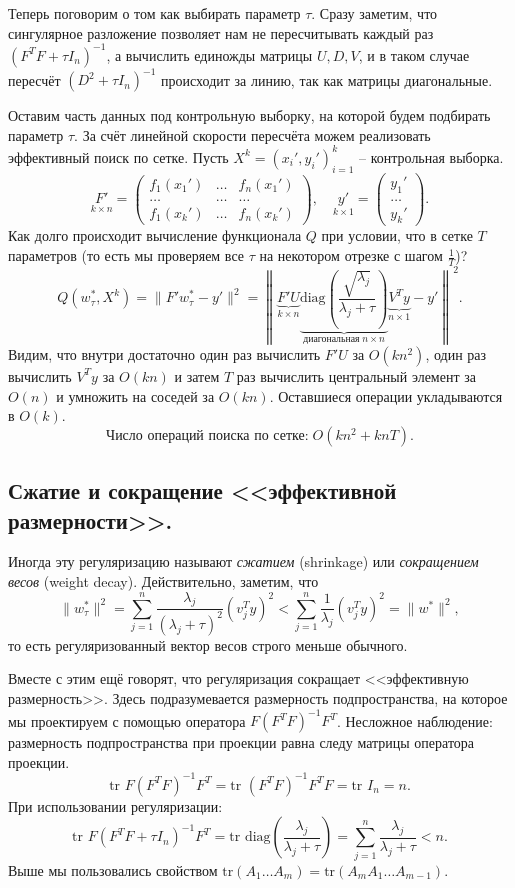 Теперь поговорим о том как выбирать параметр $\tau$. Сразу заметим, что сингулярное разложение позволяет нам не пересчитывать каждый раз $(F^TF + \tau I_n)^{-1}$, а вычислить единожды матрицы $U, D, V$, и в таком случае пересчёт $(D^2 + \tau I_n)^{-1}$ происходит за линию, так как матрицы диагональные.

Оставим часть данных под контрольную выборку, на которой будем подбирать параметр $\tau$. За счёт линейной скорости пересчёта можем реализовать эффективный поиск по сетке. Пусть $X^k = (x_i', y_i')_{i=1}^k$ -- контрольная выборка.
$$\underset{k \times n}{F'} = \begin{pmatrix}
    f_1(x_1') & \dots & f_n(x_1')  \\
    \dots     & \dots & \dots      \\
    f_1(x_k') & \dots & f_n(x_k')
  \end{pmatrix}, \quad \underset{k \times 1}{y'} = \begin{pmatrix}
    y_1'  \\
    \dots \\
    y_k'
  \end{pmatrix}.$$
Как долго происходит вычисление функционала $Q$ при условии, что в сетке $T$ параметров (то есть мы проверяем все $\tau$ на некотором отрезке с шагом $\frac{1}{T}$)?
$$Q(w_\tau^*, X^k) = \|F'w_\tau^* - y'\|^2 = \left\|\underset{k \times n}{\underbrace{F'U}} \underset{\text{диагональная} \; n \times n}{\underbrace{\text{diag}\left(\frac{\sqrt{\lambda_j}}{\lambda_j + \tau}\right)}}\underset{n \times 1}{\underbrace{V^Ty}} - y'\right\|^2.$$
Видим, что внутри достаточно один раз вычислить $F'U$ за $O(kn^2)$, один раз вычислить $V^Ty$ за $O(kn)$ и затем $T$ раз вычислить центральный элемент за $O(n)$ и умножить на соседей за $O(kn)$. Оставшиеся операции укладываются в $O(k)$.
$$\text{Число операций поиска по сетке:} \; O(kn^2 + knT).$$

\subsection*{Сжатие и сокращение <<эффективной размерности>>.}
Иногда эту регуляризацию называют \textit{сжатием} (shrinkage) или \textit{сокращением весов} (weight decay). Действительно, заметим, что
$$\|w_\tau^*\|^2 = \sum_{j=1}^n \frac{\lambda_j}{(\lambda_j + \tau)^2}(v_j^Ty)^2 < \sum_{j=1}^n \frac{1}{\lambda_j} (v_j^Ty)^2 = \|w^*\|^2,$$
то есть регуляризованный вектор весов строго меньше обычного.

Вместе с этим ещё говорят, что регуляризация сокращает <<эффективную размерность>>. Здесь подразумевается размерность подпространства, на которое мы проектируем с помощью оператора $F(F^TF)^{-1}F^T$. Несложное наблюдение: размерность подпространства при проекции равна следу матрицы оператора проекции.
$$\text{tr } F(F^TF)^{-1}F^T = \text{tr } (F^T F)^{-1} F^TF = \text{tr } I_n = n.$$
При использовании регуляризации:
$$\text{tr } F(F^TF + \tau I_n)^{-1}F^T = \text{tr } \text{diag}\left(\frac{\lambda_j}{\lambda_j + \tau}\right) = \sum_{j=1}^n \frac{\lambda_j}{\lambda_j + \tau} < n.$$
Выше мы пользовались свойством $\text{tr}(A_1 \dots A_m) = \text{tr}(A_m A_1 \dots A_{m-1})$.

